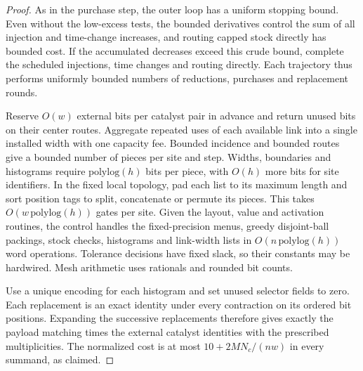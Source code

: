 \begin{proof}
As in the purchase step, the outer loop has a uniform stopping bound.
Even without the low-excess tests, the bounded derivatives control the
sum of all injection and time-change increases, and routing capped
stock directly has bounded cost. If the accumulated decreases exceed
this crude bound, complete the scheduled injections, time changes and
routing directly. Each trajectory thus performs uniformly bounded
numbers of reductions, purchases and replacement rounds.

Reserve $O(w)$ external bits per catalyst pair in advance and return
unused bits on their center routes. Aggregate repeated uses of each
available link into a single installed width with one capacity fee.
Bounded incidence and bounded routes give a bounded number of pieces
per site and step. Widths, boundaries and histograms require
$\mathrm{polylog}(h)$ bits per piece, with $O(h)$ more bits for site
identifiers. In the fixed local topology, pad each list to its maximum
length and sort position tags to split, concatenate or permute its
pieces. This takes $O(w\,\mathrm{polylog}(h))$ gates per site. Given
the layout, value and activation routines, the control handles the
fixed-precision menus, greedy disjoint-ball packings, stock checks,
histograms and link-width lists in $O(n\,\mathrm{polylog}(h))$ word
operations. Tolerance decisions have fixed slack, so their constants
may be hardwired. Mesh arithmetic uses rationals and rounded bit counts.

Use a unique encoding for each histogram and set unused selector fields
to zero. Each replacement is an exact identity under every contraction
on its ordered bit positions. Expanding the successive replacements
therefore gives exactly the payload matching times the external catalyst
identities with the prescribed multiplicities. The normalized cost is
at most $10+2MN_c/(nw)$ in every summand, as claimed.
\end{proof}
